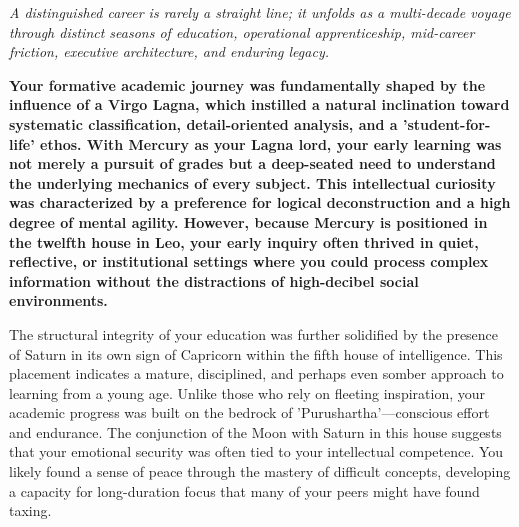 


{\fontsize{9.5}{14}\selectfont\color{DeepSlate}\itshape A distinguished career is rarely a straight line; it unfolds as a multi-decade voyage through distinct seasons of education, operational apprenticeship, mid-career friction, executive architecture, and enduring legacy.}\par\vspace{3.5mm}

\label{topic37}

{\fontsize{9.5}{13.8}\selectfont\bfseries\color{DeepSlate} Your formative academic journey was fundamentally shaped by the influence of a Virgo Lagna, which instilled a natural inclination toward systematic classification, detail-oriented analysis, and a 'student-for-life' ethos. With Mercury as your Lagna lord, your early learning was not merely a pursuit of grades but a deep-seated need to understand the underlying mechanics of every subject. This intellectual curiosity was characterized by a preference for logical deconstruction and a high degree of mental agility. However, because Mercury is positioned in the twelfth house in Leo, your early inquiry often thrived in quiet, reflective, or institutional settings where you could process complex information without the distractions of high-decibel social environments.}\par\vspace{2mm}

{\fontsize{9}{13}\selectfont The structural integrity of your education was further solidified by the presence of Saturn in its own sign of Capricorn within the fifth house of intelligence. This placement indicates a mature, disciplined, and perhaps even somber approach to learning from a young age. Unlike those who rely on fleeting inspiration, your academic progress was built on the bedrock of 'Purushartha'---conscious effort and endurance. The conjunction of the Moon with Saturn in this house suggests that your emotional security was often tied to your intellectual competence. You likely found a sense of peace through the mastery of difficult concepts, developing a capacity for long-duration focus that many of your peers might have found taxing.}\par\vspace{1.8mm}

